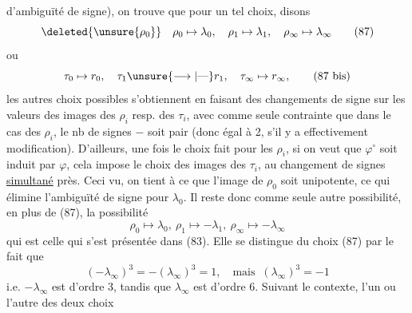 d'ambiguïté de signe), on trouve que pour un tel choix, disons
\[
\deleted{\unsure{\rho_0}}\quad\rho_0\mapsto\lambda_0,\quad\rho_1\mapsto\lambda_1,\quad\rho_\infty\mapsto\lambda_\infty\tag*{(87)}
\]
ou
\[
\tau_0\mapsto r_0,\quad\tau_1\unsure{\longrightarrow|\text{---}}r_1,\quad\tau_\infty\mapsto r_\infty,\tag*{(87 bis)}
\]
les autres choix possibles s'obtiennent en faisant des changements de signe sur les valeurs des images des $\rho_i$ resp. des $\tau_i$, avec comme seule contrainte que dans le cas des $\rho_i$, le nb de signes $-$ soit pair (donc égal à 2, s'il y a effectivement modification). D'ailleurs, une fois le choix fait pour les $\rho_i$, si on veut que $\varphi^\circ$ soit induit par $\varphi$, cela impose le choix des images des $\tau_i$, au changement de signes \uline{simultané} près. Ceci vu, on tient à ce que l'image de $\rho_0$ soit  unipotente, ce qui élimine l'ambiguïté de signe pour $\lambda_0$.  Il reste donc comme seule autre possibilité, en plus de (87), la possibilité
\[
\rho_0\mapsto\lambda_0,\ \rho_1\mapsto-\lambda_1,\ \rho_\infty\mapsto-\lambda_\infty\tag*{(88)}
\]
qui est celle qui s'est présentée dans (83). Elle se distingue du choix (87) par le fait que
\[
(-\lambda_\infty)^3=-(\lambda_\infty)^3=1,\quad\text{mais }\ (\lambda_\infty)^3=-1
\]
i.e. $-\lambda_\infty$ est d'ordre 3, tandis que $\lambda_\infty$ est d'ordre 6. Suivant le contexte, l'un ou l'autre des deux choix
